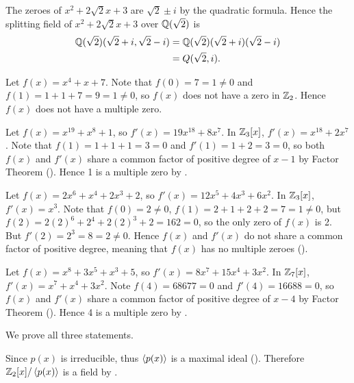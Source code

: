 \begin{questions}
\begin{partquestions}{\alph*}
        \item The zeroes of $x^2 + 2\sqrt2x + 3$ are $\sqrt2 \pm i$ by the quadratic formula. Hence the splitting field of $x^2 + 2\sqrt2x + 3$ over $\mathbb{Q}(\sqrt2)$ is
        \begin{align*}
            \mathbb{Q}(\sqrt2)(\sqrt2+i, \sqrt2-i) &= \mathbb{Q}(\sqrt2)(\sqrt2 + i)(\sqrt2 - i)\\
            &= Q(\sqrt2, i).
        \end{align*}
    \end{partquestions}

    \item \begin{partquestions}{\alph*}
        \item Let $f(x) = x^4 + x + 7$. Note that $f(0) = 7 = 1 \neq 0$ and $f(1) = 1 + 1 + 7 = 9 = 1 \neq 0$, so $f(x)$ does not have a zero in $\mathbb{Z}_2$. Hence $f(x)$ does not have a multiple zero.

        \item Let $f(x) = x^{19} + x^8 + 1$, so $f'(x) = 19x^{18} + 8x^7$. In $\mathbb{Z}_3[x]$, $f'(x) = x^{18} + 2x^7$. Note that $f(1) = 1 + 1 + 1 = 3 = 0$ and $f'(1) = 1 + 2 = 3 = 0$, so both $f(x)$ and $f'(x)$ share a common factor of positive degree of $x-1$ by Factor Theorem (). Hence 1 is a multiple zero by .

        \item Let $f(x) = 2x^6 + x^4 + 2x^3 + 2$, so $f'(x) = 12x^5 + 4x^3 + 6x^2$. In $\mathbb{Z}_3[x]$, $f'(x) = x^3$. Note that $f(0) = 2 \neq 0$, $f(1) = 2 + 1 + 2 + 2 = 7 = 1 \neq 0$, but $f(2) = 2(2)^6 + 2^4 + 2(2)^3 + 2 = 162 = 0$, so the only zero of $f(x)$ is 2. But $f'(2) = 2^3 = 8 = 2 \neq 0$. Hence $f(x)$ and $f'(x)$ do not share a common factor of positive degree, meaning that $f(x)$ has no multiple zeroes ().

        \item Let $f(x) = x^8 + 3x^5 + x^3 + 5$, so $f'(x) = 8x^7 + 15x^4 + 3x^2$. In $\mathbb{Z}_7[x]$, $f'(x) = x^7 + x^4 + 3x^2$. Note $f(4) = 68677 = 0$ and $f'(4) = 16688 = 0$, so $f(x)$ and $f'(x)$ share a common factor of positive degree of $x-4$ by Factor Theorem (). Hence 4 is a multiple zero by .
    \end{partquestions}

    \item We prove all three statements.
    \begin{partquestions}{\roman*}
        \item Since $p(x)$ is irreducible, thus $\left\langle p(x)\right\rangle$ is a maximal ideal (). Therefore $\mathbb{Z}_2[x]/\left\langle p(x)\right\rangle$ is a field by .


\end{partquestions}
\end{questions}

